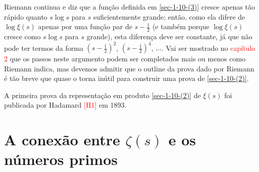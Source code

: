     Riemann continua e diz que a função definida em \eqref{sec-1-10-(3)} cresce apenas tão rápido quanto $s \log s$ para $s$ suficientemente grande; então, como ela difere de $\log \xi(s)$ apenas por uma função par de $s - \frac{1}{2}$ (e também porque $\log \xi(s)$ cresce como $s \log s$ para $s$ grande), esta diferença deve ser constante, já que não pode ter termos da forma $(s - \frac{1}{2})^2$, $(s - \frac{1}{2})^4$, $\dots$. Vai ser mostrado no \textcolor{red}{capítulo 2} que os passos neste argumento podem ser completados mais ou menos como Riemann indica, mas devemos admitir que o outline da prova dado por Riemann é tão breve que quase o torna inútil para construir uma prova de \eqref{sec-1-10-(2)}.
    
    A primeira prova da representação em produto \eqref{sec-1-10-(2)} de $\xi(s)$ foi publicada por Hadamard \textcolor{red}{[H1]} em 1893.
    
    
    \section{A conexão entre $\zeta(s)$ e os números primos}
    
